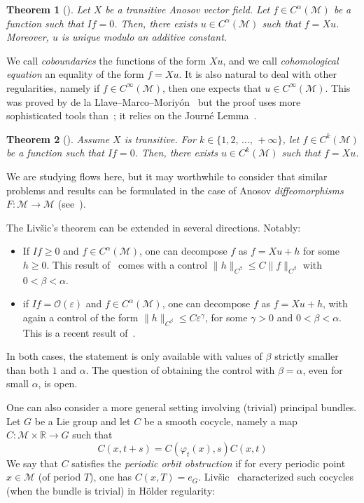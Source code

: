 \documentclass[10pt]{amsart}
\newtheorem{theo}{Theorem}[section]
\theoremstyle{definition}\newtheorem{defi}[theo]{Definition}\newtheorem{rema}[theo]{Remark}\newtheorem{exam}[theo]{Example}\newtheorem{exem}[theo]{Example}\newtheorem{nota}[theo]{Notation}
\newcommand{\R}{\mathbb{R}}
\newcommand{\eps}{\varepsilon}
\newcommand{\mc}{\mathcal}
\newcommand{\M}{\mathcal{M}}
\begin{document}
\begin{theo}[\cite{Livsic-72}]
Let $X$ be a transitive Anosov vector field. Let $f \in C^\alpha(\M)$ be a function such that $If = 0$. Then, there exists $u \in C^\alpha(\M)$ such that $f = Xu$. Moreover, $u$ is unique modulo an additive constant.
\end{theo}

We call \emph{coboundaries} the functions of the form $Xu$, and we call \emph{cohomological equation} an equality of the form $f =Xu$. It is also natural to deal with other regularities, namely if $f \in C^\infty(\M)$, then one expects that $u \in C^\infty(\M)$. This was proved by de la Llave--Marco--Moriyón~\cite{DeLaLlave-Marco-Moryon-86} but the proof uses more sophisticated tools than~\cite{Livsic-72}; it relies on the Journé Lemma~\cite{Journe-86}.

\begin{theo}[\cite{DeLaLlave-Marco-Moryon-86}]\label{theorem:livsic-smooth}
Assume $X$ is transitive. For $k \in \{1,2,\,\dots,\,+\infty\}$, let $f \in C^k(\M)$ be a function such that $If=0$. Then, there exists $u \in C^k(\M)$ such that $f=Xu$.
\end{theo}

We are studying flows here, but it may worthwhile to consider that similar problems and results can be formulated in the case of Anosov \emph{diffeomorphisms} $F : \M \rightarrow \M$ (see~\cite{Hasselblatt-Katok-95}).

The Liv{\v s}ic's theorem can be extended in several directions. Notably:
\begin{itemize}
\item If $If \geq 0$ and $f \in C^\alpha(\M)$, one can decompose $f$ as $f = Xu + h$ for some $h \geq 0$. This result of~\cite{Lopes-Thieullen-05} comes with a control $\|h\|_{C^{\beta}} \leq C \|f\|_{C^\beta}$ with $0<\beta < \alpha$.
\item if $If = \mc{O}(\eps)$ and $f \in C^\alpha(\M)$, one can decompose $f$ as $f = Xu+h$, with again a control of the form $\|h\|_{C^\beta} \leq C \eps^\gamma$, for some $\gamma > 0$ and $0<\beta < \alpha$. This is a recent result of~\cite{Gouezel-Lefeuvre-19}.
\end{itemize}
In both cases, the statement is only available with values of $\beta$ strictly smaller than both $1$ and $\alpha$. The question of obtaining the control with $\beta = \alpha$, even for small $\alpha$, is open.

One can also consider a more general setting involving (trivial) principal bundles. Let $G$ be a Lie group and let $C$ be a smooth cocycle, namely a map $C : \mc{M} \times \R \rightarrow G$ such that
\[
C(x,t+s) = C(\varphi_t (x), s)C(x,t)
\]
We say that $C$ satisfies the \emph{periodic orbit obstruction} if for every periodic point $x \in \M$ (of period $T$), one has $C(x,T) = e_G$. Liv{\v s}ic~\cite{Livsic-72} characterized such cocycles (when the bundle is trivial) in H\"older regularity:
\end{document}
